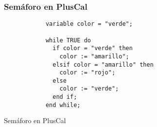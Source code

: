 \documentclass{beamer}
\begin{document}
\begin{frame}[fragile]
  \frametitle{Semáforo en PlusCal}

  \begin{listing}[H]
    \begin{center}
      \begin{minipage}{0.5\textwidth}
        \begin{verbatim}
            variable color = "verde";

            while TRUE do
              if color = "verde" then
                color := "amarillo";
              elsif color = "amarillo" then
                color := "rojo";
              else
                color := "verde";
              end if;
            end while;
        \end{verbatim}
      \end{minipage}
    \end{center}
    \caption{Semáforo en PlusCal}
    \label{lst:sem_pluscal}
  \end{listing}
\end{frame}
\end{document}
